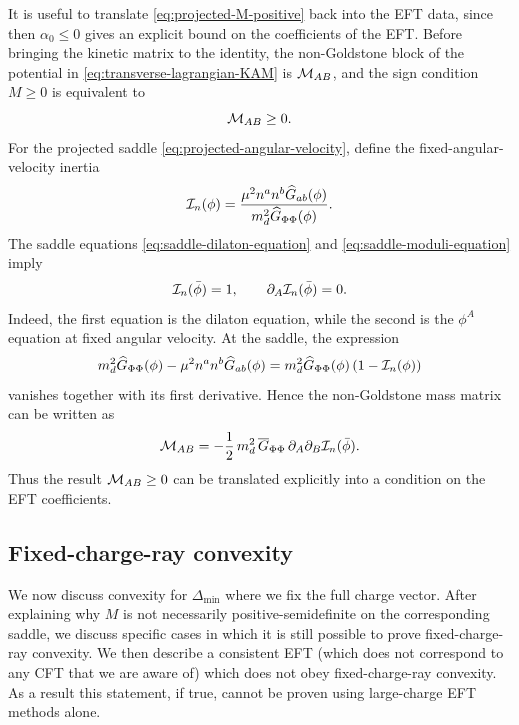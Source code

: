 \documentclass[a4paper,11pt]{article}
\newcommand\Dm{\Delta_{\min}}
\begin{document}
It is useful to translate \eqref{eq:projected-M-positive} back into the EFT data, since then $\alpha_0\leq 0$ gives an explicit bound on the coefficients of the EFT. Before bringing the kinetic matrix to the identity, the non-Goldstone block of the potential in \eqref{eq:transverse-lagrangian-KAM} is ${\cal M}_{AB}$, and the sign
condition $M\geq0$ is equivalent to
\begin{equation}
  {\cal M}_{AB}\geq0.
\end{equation}
For the projected saddle \eqref{eq:projected-angular-velocity}, define the fixed-angular-velocity inertia
\begin{equation}\label{eq:projected-inertia}
  {\cal I}_n(\phi) = \frac{\mu^2 n^an^b\widehat G_{ab}(\phi)} {m_d^2\widehat G_{\Phi\Phi}(\phi)} .
\end{equation}
The saddle equations \eqref{eq:saddle-dilaton-equation} and \eqref{eq:saddle-moduli-equation} imply
\begin{equation}
  {\cal I}_n(\bar\phi)=1, \qquad \partial_A{\cal I}_n(\bar\phi)=0 .
\end{equation}
Indeed, the first equation is the dilaton equation, while the second is the $\phi^A$ equation at fixed angular velocity. At the saddle, the expression
\begin{equation}
  m_d^2\widehat G_{\Phi\Phi}(\phi) - \mu^2n^an^b\widehat G_{ab}(\phi) = m_d^2\widehat G_{\Phi\Phi}(\phi) \left(1-{\cal I}_n(\phi)\right)
\end{equation}
vanishes together with its first derivative. Hence the non-Goldstone mass matrix can be written as
\begin{equation}\label{eq:projected-M-inertia}
  {\cal M}_{AB} = -\frac12\,m_d^2\,\overline{G}_{\Phi\Phi}\, \partial_A\partial_B{\cal I}_n(\bar\phi).
\end{equation}
Thus the result ${\cal M}_{AB}\geq0$ can be translated explicitly into a condition on the EFT coefficients.


\subsection{Fixed-charge-ray convexity}\label{subsec:fixed-ray-limitations}

We now discuss convexity for $\Dm$ where we fix the full charge vector. After explaining why $M$ is not necessarily positive-semidefinite on the corresponding saddle, we discuss specific cases in which it is still possible to prove fixed-charge-ray convexity. We then describe a consistent EFT (which does not correspond to any CFT that we are aware of) which does not obey fixed-charge-ray convexity. As a result this statement, if true, cannot be proven using large-charge EFT methods alone.
\end{document}
